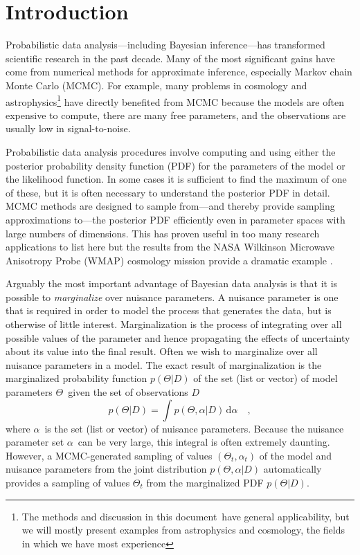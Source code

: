 \documentclass[12pt,preprint]{aastex}
\newcommand{\paper}{document}
\newcommand{\eqlabel}[1]{\label{eq:#1}}
\newcommand{\dd}{\mathrm{d}}
\renewcommand{\vector}[1]{#1}
\newcommand{\pr}[1]{\ensuremath{p(#1)}}
\newcommand{\model}{\ensuremath{\vector{\Theta}}}
\newcommand{\data}{\ensuremath{\vector{D}}}
\newcommand{\nuisance}{\ensuremath{\vector{\alpha}}}
\begin{document}
\section{Introduction}

Probabilistic data analysis---including Bayesian inference---has
transformed scientific research in the past decade. Many of the most
significant gains have come from numerical methods for approximate
inference, especially Markov chain Monte Carlo (MCMC).  For example,
many problems in cosmology and astrophysics\footnote{The methods and
  discussion in this \paper\ have general applicability, but we will
  mostly present examples from astrophysics and cosmology, the fields
  in which we have most experience} have directly benefited from MCMC
because the models are often expensive to compute, there are many free
parameters, and the observations are usually low in signal-to-noise.

Probabilistic data analysis procedures involve computing and using
either the posterior probability density function (PDF) for the
parameters of the model or the likelihood function. In some cases it
is sufficient to find the maximum of one of these, but it is often
necessary to understand the posterior PDF in detail.  MCMC methods are
designed to sample from---and thereby provide sampling approximations
to---the posterior PDF efficiently even in parameter spaces with large
numbers of dimensions. This has proven useful in too many research
applications to list here but the results from the NASA Wilkinson
Microwave Anisotropy Probe (WMAP) cosmology mission provide a dramatic
example \citep[for example,][]{Dunkley:2005}.

Arguably the most important advantage of Bayesian data analysis is
that it is possible to \emph{marginalize} over nuisance parameters. A
nuisance parameter is one that is required in order to model the
process that generates the data, but is otherwise of little interest.
Marginalization is the process of integrating over all possible values of
the  parameter and hence propagating the effects of uncertainty about
its value into the final result.  Often we wish to marginalize over all
nuisance parameters in a model.  The exact result of marginalization
is the marginalized probability function \pr{\model | \data}
of the set (list or vector) of model parameters
\model\ given the set of observations \data
\begin{equation}
    \eqlabel{marginalization}
    \pr{\model | \data} = \int
        \pr{ \model, \nuisance | \data} \,
        \dd  \nuisance \quad,
\end{equation}
where \nuisance\ is the set (list or vector) of nuisance
parameters. Because the nuisance parameter set \nuisance\ can be very large, this
integral is often extremely daunting.  However, a
MCMC-generated sampling of values $(\model_t,\nuisance_t)$ of the
model and nuisance parameters from the joint distribution $\pr{\model,
  \nuisance | \data}$ automatically provides a sampling of values
$\model_t$ from the marginalized PDF $\pr{\model | \data}$.
\end{document}
